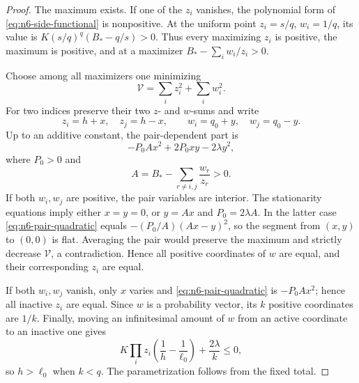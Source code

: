 \documentclass[11pt]{article}
\theoremstyle{definition}
\newcommand{\1}{\mathbf{1}}
\begin{document}
\begin{proof}
The maximum exists.  If one of the $z_i$ vanishes, the polynomial form of
\eqref{eq:n6-side-functional} is nonpositive.  At the uniform point
$z_i=s/q$, $w_i=1/q$, its value is
$K(s/q)^q(B_*-q/s)>0$.  Thus every maximizing $z_i$ is positive, the
maximum is positive, and at a maximizer
$B_*-\sum_iw_i/z_i>0$.

Choose among all maximizers one minimizing
\[
 \mathcal V=\sum_i z_i^2+\sum_iw_i^2.
\]
For two indices preserve their two $z$- and $w$-sums and write
\[
 z_i=h+x,\quad z_j=h-x,
 \qquad
 w_i=q_0+y,\quad w_j=q_0-y.
\]
Up to an additive constant, the pair-dependent part is
\begin{equation}\label{eq:n6-pair-quadratic}
 -P_0A x^2+2P_0xy-2\lambda y^2,
\end{equation}
where $P_0>0$ and
\[
 A=B_*-\sum_{r\ne i,j}\frac{w_r}{z_r}>0.
\]
If both $w_i,w_j$ are positive, the pair variables are interior.  The
stationarity equations imply either $x=y=0$, or
$y=Ax$ and $P_0=2\lambda A$.  In the latter case
\eqref{eq:n6-pair-quadratic} equals
$-(P_0/A)(Ax-y)^2$, so the segment from $(x,y)$ to $(0,0)$ is flat.
Averaging the pair would preserve the maximum and strictly decrease
$\mathcal V$, a contradiction.  Hence all positive coordinates of $w$ are
equal, and their corresponding $z_i$ are equal.

If both $w_i,w_j$ vanish, only $x$ varies and
\eqref{eq:n6-pair-quadratic} is $-P_0Ax^2$; hence all inactive $z_i$ are
equal.  Since $w$ is a probability vector, its $k$ positive coordinates
are $1/k$.  Finally, moving an infinitesimal amount of $w$ from an active
coordinate to an inactive one gives
\[
 K\prod_i z_i\left(\frac1h-\frac1{\ell_0}\right)
 +\frac{2\lambda}{k}\le0,
\]
so $h>\ell_0$ when $k<q$.  The parametrization follows from the fixed total.
\end{proof}
\end{document}
